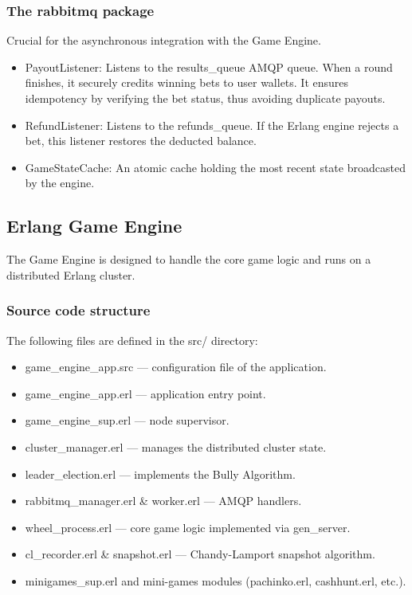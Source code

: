 \documentclass[12pt,a4paper]{article}
\begin{document}
\subsubsection{The rabbitmq package}
Crucial for the asynchronous integration with the Game Engine.
\begin{itemize}
    \item PayoutListener: Listens to the results\_queue AMQP queue. When a round finishes, it securely credits winning bets to user wallets. It ensures idempotency by verifying the bet status, thus avoiding duplicate payouts.
    \item RefundListener: Listens to the refunds\_queue. If the Erlang engine rejects a bet, this listener restores the deducted balance.
    \item GameStateCache: An atomic cache holding the most recent state broadcasted by the engine.
\end{itemize}

\subsection{Erlang Game Engine}
The Game Engine is designed to handle the core game logic and runs on a distributed Erlang cluster.

\subsubsection{Source code structure}
The following files are defined in the src/ directory:
\begin{itemize}
    \item game\_engine\_app.src --- configuration file of the application.
    \item game\_engine\_app.erl --- application entry point.
    \item game\_engine\_sup.erl --- node supervisor.
    \item cluster\_manager.erl --- manages the distributed cluster state.
    \item leader\_election.erl --- implements the Bully Algorithm.
    \item rabbitmq\_manager.erl \& worker.erl --- AMQP handlers.
    \item wheel\_process.erl --- core game logic implemented via gen\_server.
    \item cl\_recorder.erl \& snapshot.erl --- Chandy-Lamport snapshot algorithm.
    \item minigames\_sup.erl and mini-games modules (pachinko.erl, cashhunt.erl, etc.).
\end{itemize}
\end{document}
